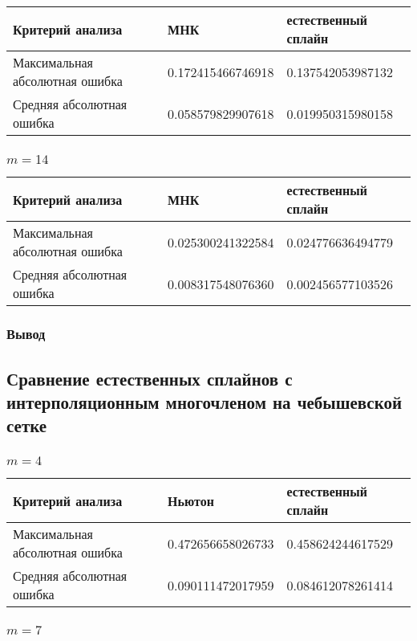 \documentclass[paper=a4, fontsize=11pt]{scrartcl} %
\numberwithin{equation}{section} %
\numberwithin{figure}{section} %
\numberwithin{table}{section} %
\begin{document}
\begin{tabular}{|p{4 cm}|p{4 cm}|p{4 cm}|}
\hline
	Критерий анализа & МНК & естественный сплайн \\
\hline 
	Максимальная абсолютная ошибка & 0.172415466746918 & 0.137542053987132 \\
\hline 
	Средняя абсолютная ошибка & 0.058579829907618 &  0.019950315980158 \\
\hline
\end{tabular}

\subsubsection{$m=14$}

\begin{tabular}{|p{4 cm}|p{4 cm}|p{4 cm}|}
\hline
	Критерий анализа & МНК & естественный сплайн \\
\hline 
	Максимальная абсолютная ошибка & 0.025300241322584 & 0.024776636494779 \\
\hline 
	Средняя абсолютная ошибка & 0.008317548076360 &  0.002456577103526 \\
\hline
\end{tabular}

\subsubsection{Вывод}

\subsection{Сравнение естественных сплайнов с интерполяционным многочленом на чебышевской сетке}

\subsubsection{$m=4$}

\begin{tabular}{|p{4 cm}|p{4 cm}|p{4 cm}|}
\hline
	Критерий анализа & Ньютон & естественный сплайн \\
\hline 
	Максимальная абсолютная ошибка & 0.472656658026733 & 0.458624244617529\\
\hline 
	Средняя абсолютная ошибка & 0.090111472017959 & 0.084612078261414 \\
\hline
\end{tabular}

\subsubsection{$m=7$}
\end{document}

